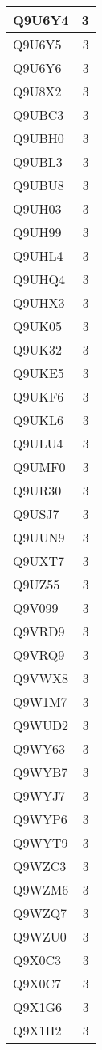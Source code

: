 \documentclass[
]{book}
\theoremstyle{definition}
\theoremstyle{definition}
\theoremstyle{definition}
\theoremstyle{definition}
\theoremstyle{remark}
\begin{document}
\begin{table}
\begin{tabular}{l|r}
\hline
Q9U6Y4 & 3\\
\hline
Q9U6Y5 & 3\\
\hline
Q9U6Y6 & 3\\
\hline
Q9U8X2 & 3\\
\hline
Q9UBC3 & 3\\
\hline
Q9UBH0 & 3\\
\hline
Q9UBL3 & 3\\
\hline
Q9UBU8 & 3\\
\hline
Q9UH03 & 3\\
\hline
Q9UH99 & 3\\
\hline
Q9UHL4 & 3\\
\hline
Q9UHQ4 & 3\\
\hline
Q9UHX3 & 3\\
\hline
Q9UK05 & 3\\
\hline
Q9UK32 & 3\\
\hline
Q9UKE5 & 3\\
\hline
Q9UKF6 & 3\\
\hline
Q9UKL6 & 3\\
\hline
Q9ULU4 & 3\\
\hline
Q9UMF0 & 3\\
\hline
Q9UR30 & 3\\
\hline
Q9USJ7 & 3\\
\hline
Q9UUN9 & 3\\
\hline
Q9UXT7 & 3\\
\hline
Q9UZ55 & 3\\
\hline
Q9V099 & 3\\
\hline
Q9VRD9 & 3\\
\hline
Q9VRQ9 & 3\\
\hline
Q9VWX8 & 3\\
\hline
Q9W1M7 & 3\\
\hline
Q9WUD2 & 3\\
\hline
Q9WY63 & 3\\
\hline
Q9WYB7 & 3\\
\hline
Q9WYJ7 & 3\\
\hline
Q9WYP6 & 3\\
\hline
Q9WYT9 & 3\\
\hline
Q9WZC3 & 3\\
\hline
Q9WZM6 & 3\\
\hline
Q9WZQ7 & 3\\
\hline
Q9WZU0 & 3\\
\hline
Q9X0C3 & 3\\
\hline
Q9X0C7 & 3\\
\hline
Q9X1G6 & 3\\
\hline
Q9X1H2 & 3\\

\end{tabular}
\end{table}
\end{document}
